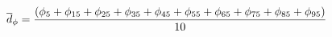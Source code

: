 \documentclass[10pt]{article}
\begin{document}
\begin{align*}\overline d_\phi={ (\phi_5 + \phi_{15} + \phi_{25} + \phi_{35} + \phi_{45} + \phi_{55} + \phi_{65} + \phi_{75} + \phi_{85} + \phi_{95} )  \over 10 }\end{align*}
\end{document}
